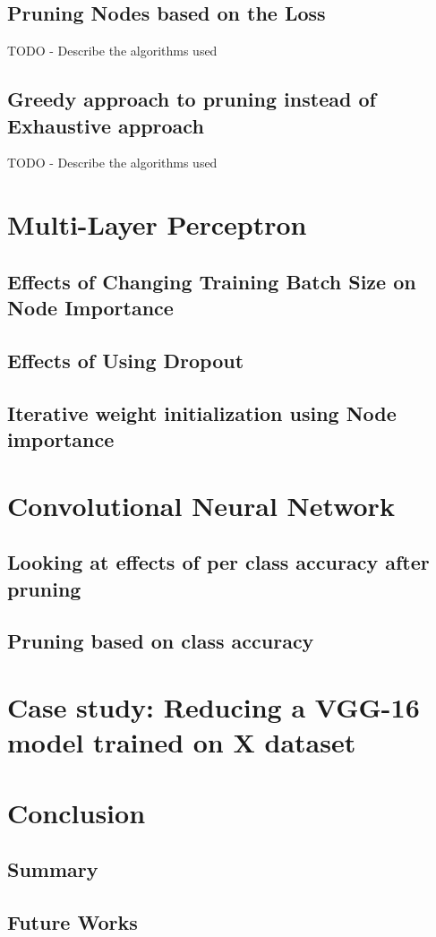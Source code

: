 \documentclass[UKenglish]{ifimaster}
\begin{document}
    \section{Pruning Nodes based on the Loss}
        TODO - Describe the algorithms used

    \section{Greedy approach to pruning instead of Exhaustive approach}
        TODO - Describe the algorithms used

\chapter{Multi-Layer Perceptron}
    \section{Effects of Changing Training Batch Size on Node Importance}


    \section{Effects of Using Dropout}


    \section{Iterative weight initialization using Node importance}



\chapter{Convolutional Neural Network}
    \section{Looking at effects of per class accuracy after pruning}


    \section{Pruning based on class accuracy}


\chapter{Case study: Reducing a VGG-16 model trained on X dataset}

\chapter{Conclusion}
    \section{Summary}


    \section{Future Works}


\backmatter{}
\printbibliography
\end{document}
